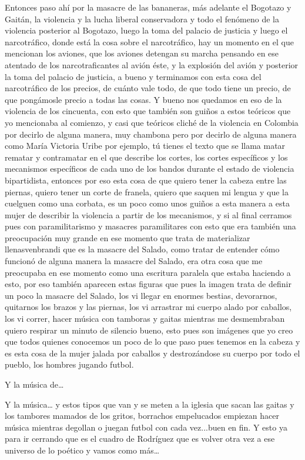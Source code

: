 Entonces paso ahí por la masacre de las bananeras, más adelante el Bogotazo y Gaitán, la violencia y la lucha liberal conservadora y todo el fenómeno de la violencia posterior al Bogotazo, luego la toma del palacio de justicia y luego el narcotráfico, donde está la cosa sobre el narcotráfico, hay un momento en el que mencionan los aviones, que los aviones detengan su marcha pensando en ese atentado de los narcotraficantes al avión éste, y la explosión del avión y posterior la toma del palacio de justicia, a bueno y terminamos con esta cosa del narcotráfico de los precios, de cuánto vale todo, de que todo tiene un precio, de que pongámosle precio a todas las cosas.
Y bueno nos quedamos en eso de la violencia de los cincuenta, con esto que también son guiños a estos teóricos que yo mencionaba	 al comienzo, y casi que teóricos cliché de la violencia en Colombia por decirlo de alguna manera, muy chambona pero por decirlo de alguna manera como María Victoria Uribe por ejemplo, tú tienes el texto que se llama matar rematar y contramatar en el que describe los cortes, los cortes específicos y los mecanismos específicos de cada uno de los bandos durante el estado de violencia bipartidista, entonces por eso esta cosa de que quiero tener la cabeza entre las piernas, quiero tener un corte de franela, quiero que saquen mi lengua y que la cuelguen como una corbata, es un poco como unos guiños a esta manera a esta mujer de describir la violencia a partir de los mecanismos, y si al final cerramos pues con paramilitarismo y masacres paramilitares con esto que era también una preocupación muy grande en ese momento que trata de materializar llenasvenbrandi que es la masacre del Salado, como tratar de entender cómo funcionó de alguna manera la masacre del Salado, era otra cosa que me preocupaba en ese momento como una escritura paralela que estaba haciendo a esto, por eso también aparecen estas figuras que pues la imagen trata de definir un poco la masacre del Salado, los vi llegar en enormes bestias, devorarnos, quitarnos los brazos y las piernas, los vi arrastrar mi cuerpo alado por caballos, los vi correr, hacer música con tamboras y gaitas mientras me desmembraban quiero respirar un minuto de silencio bueno, esto pues son imágenes que yo creo que todos quienes conocemos un poco de lo que paso pues tenemos en la cabeza y es esta cosa de la mujer jalada por caballos y destrozándose su cuerpo por todo el pueblo, los hombres jugando futbol.

Y la música de…

Y la música… y estos tipos que van y se meten a la iglesia que sacan las gaitas y los tambores mamados de los gritos, borrachos empelucados empiezan hacer música mientras degollan o juegan futbol con cada vez...buen en fin.
Y esto ya para ir cerrando que es el cuadro de Rodríguez que es volver otra vez a ese universo de lo poético y vamos como más…

